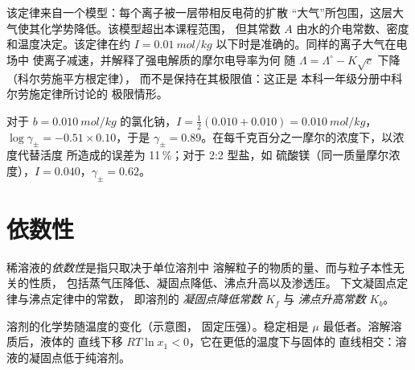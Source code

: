 \begin{remark}[适用范围与来源]\label{rem:b2:chemical-potential:dh-range}
该定律来自一个模型：每个离子被一层带相反电荷的扩散
“大气”所包围，这层大气使其化学势降低。该模型超出本课程范围，
但其常数 $A$ 由水的介电常数、密度和温度决定。该定律在约
$I = \qty{0.01}{mol/kg}$ 以下时是准确的。同样的离子大气在电场中
使离子减速，并解释了强电解质的摩尔电导率为何
随 $\Lambda = \Lambda^\circ - K\sqrt c$ 下降（科尔劳施平方根定律），
而不是保持在其极限值：这正是
本科一年级分册中科尔劳施定律所讨论的
极限情形。
\end{remark}

\begin{example}[百分之一摩尔浓度的盐]\label{ex:b2:chemical-potential:dh}
对于 $b = \qty{0.010}{mol/kg}$ 的氯化钠，$I = \frac12(0.010 + 0.010)
= \qty{0.010}{mol/kg}$，$\log\gamma_\pm = -0.51 \times 0.10$，于是 $\gamma_\pm
= 0.89$。在每千克百分之一摩尔的浓度下，以浓度代替活度
所造成的误差为 11\,\%；对于 2:2 型盐，如
硫酸镁（同一质量摩尔浓度），$I = 0.040$，$\gamma_\pm = 0.62$。
\end{example}

\section{依数性}

\begin{definition}[依数性]\label{def:b2:chemical-potential:colligative}
稀溶液的\emph{依数性}是指只取决于单位溶剂中
溶解粒子的物质的量、而与粒子本性无关的性质，
包括蒸气压降低、凝固点降低、沸点升高以及渗透压。
下文凝固点定律与沸点定律中的常数，
即溶剂的
\emph{凝固点降低常数} $K_f$
与
\emph{沸点升高常数} $K_b$。
\end{definition}

\begin{omfigure}

{\small 溶剂的化学势随温度的变化（示意图，
固定压强）。稳定相是 $\mu$ 最低者。溶解溶质后，液体的
直线下移 $RT\ln x_1 < 0$，它在更低的温度下与固体的
直线相交：溶液的凝固点低于纯溶剂。}
\end{omfigure}

